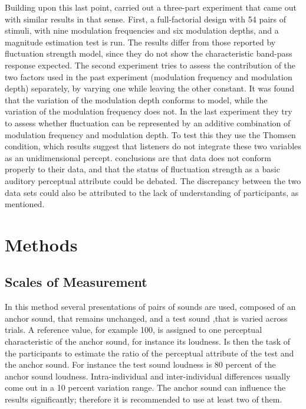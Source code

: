 \documentclass[../main.tex]{subfiles}
\begin{document}
\begin{theoreticalbackground}
Building upon this last point, \citeauthor{Wickelmaier2004Scaling} carried out
a three-part experiment that came out with similar results in that sense. First,
a full-factorial design with 54 pairs of stimuli, with nine modulation
frequencies and six modulation depths, and a magnitude estimation test is run.
The results differ from those reported by \citeauthor{Fastl2007Psychoacoustics}
fluctuation strength model, since they do not show the characteristic band-pass
response expected. The second experiment tries to assess the contribution of the
two factors used in the past experiment (modulation frequency and modulation
depth) separately, by varying one while leaving the other constant. It was found
that the variation of the modulation depth conforms to
\citeauthor{Fastl2007Psychoacoustics} model, while the variation of the
modulation frequency does not. In the last experiment they try to assess whether
fluctuation can be represented by an additive combination of modulation
frequency and modulation depth. To test this they use the Thomsen condition,
which results suggest that listeners do not integrate these two variables as an
unidimensional percept. \citeauthor{Wickelmaier2004Scaling} conclusions are that
\citeauthor{Fastl2007Psychoacoustics} data does not conform properly to their
data, and that the status of fluctuation strength as a basic auditory perceptual
attribute could be debated. The discrepancy between the two data sets could also
be attributed to the lack of understanding of participants, as
\citeauthor{Accolti2009Fluctuation} mentioned.

\section{Methods}

\subsection{Scales of Measurement}

In this method several presentations of pairs of sounds are used, composed of an anchor sound, that remains unchanged, and a test sound ,that is varied across trials. A reference value, for example 100, is assigned to one perceptual characteristic of the anchor sound, for instance its loudness. Is then the task of the participants to estimate the ratio of the perceptual attribute of the test and the anchor sound. For instance the test sound loudness is 80 percent of the anchor sound loudness. Intra-individual and inter-individual differences usually come out in a 10 percent variation range. The anchor sound can influence the results significantly; therefore it is recommended to use at least two of them.


\end{theoreticalbackground}
\end{document}

